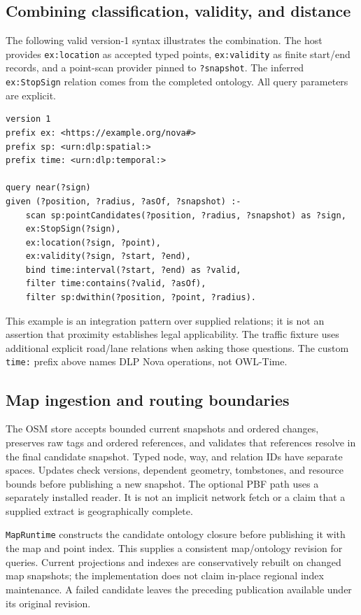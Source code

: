 \documentclass{article}
\newcommand{\code}[1]{\texttt{#1}}
\begin{document}
\subsection{Combining classification, validity, and distance}
The following valid version-1 syntax illustrates the combination. The host
provides \code{ex:location} as accepted typed points,
\code{ex:validity} as finite start/end records, and a point-scan provider pinned
to \code{?snapshot}. The inferred \code{ex:StopSign} relation comes from the
completed ontology. All query parameters are explicit.
\begin{lstlisting}
version 1
prefix ex: <https://example.org/nova#>
prefix sp: <urn:dlp:spatial:>
prefix time: <urn:dlp:temporal:>

query near(?sign)
given (?position, ?radius, ?asOf, ?snapshot) :-
    scan sp:pointCandidates(?position, ?radius, ?snapshot) as ?sign,
    ex:StopSign(?sign),
    ex:location(?sign, ?point),
    ex:validity(?sign, ?start, ?end),
    bind time:interval(?start, ?end) as ?valid,
    filter time:contains(?valid, ?asOf),
    filter sp:dwithin(?position, ?point, ?radius).
\end{lstlisting}
This example is an integration pattern over supplied relations; it is not an
assertion that proximity establishes legal applicability. The traffic fixture
uses additional explicit road/lane relations when asking those questions. The
custom \code{time:} prefix above names DLP Nova operations, not OWL-Time.

\subsection{Map ingestion and routing boundaries}
The OSM store accepts bounded current snapshots and ordered changes, preserves
raw tags and ordered references, and validates that references resolve in the
final candidate snapshot. Typed node, way, and relation IDs have separate
spaces. Updates check versions, dependent geometry, tombstones, and resource
bounds before publishing a new snapshot. The optional PBF path uses a separately
installed reader. It is not an implicit network fetch or a claim that a supplied
extract is geographically complete.

\code{MapRuntime} constructs the candidate ontology closure before publishing
it with the map and point index. This supplies a consistent map/ontology revision
for queries. Current projections and indexes are conservatively rebuilt on
changed map snapshots; the implementation does not claim in-place regional
index maintenance. A failed candidate leaves the preceding publication available
under its original revision.
\end{document}
